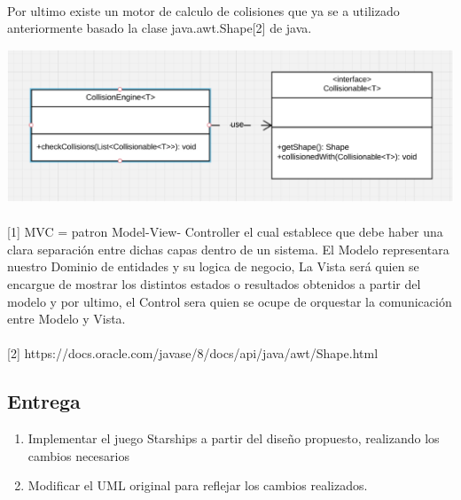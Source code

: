 \documentclass[a4paper,10pt]{extarticle}
\begin{document}
        \paragraph{}
        Por ultimo existe un motor de calculo de colisiones que ya se a utilizado
        anteriormente basado la clase java.awt.Shape[2] de java.

        \begin{center}
          \includegraphics[scale=0.55]{collisionable.png}  
        \end{center}

        \paragraph{}
        [1] MVC = patron Model-View- Controller el cual establece que debe haber
        una clara separación entre dichas capas dentro de un sistema. El Modelo
        representara nuestro Dominio de entidades y su logica de negocio, La Vista será
        quien se encargue de mostrar los distintos estados o resultados obtenidos a partir
        del modelo y por ultimo, el Control sera quien se ocupe de orquestar la
        comunicación entre Modelo y Vista.

        \paragraph{}
        [2] https://docs.oracle.com/javase/8/docs/api/java/awt/Shape.html

    \subsection{Entrega}
        \begin{enumerate}
            \item Implementar el juego Starships a partir del diseño propuesto, realizando los cambios necesarios
            \item Modificar el UML original para reflejar los cambios realizados.
        \end{enumerate}
\pagebreak
\end{document}
